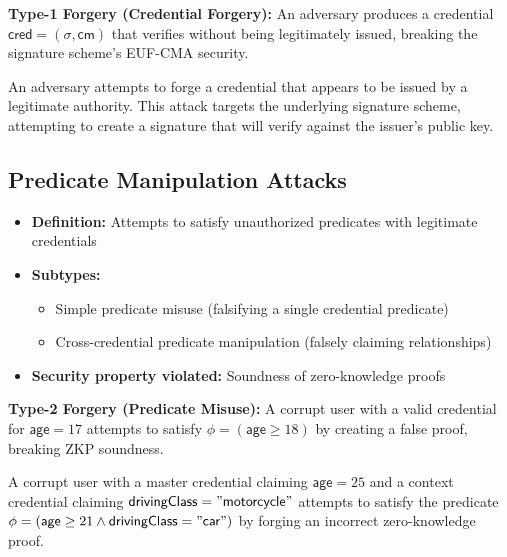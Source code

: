 \noindent\textbf{Type-1 Forgery (Credential Forgery):} An adversary produces a credential $\mathsf{cred} = (\sigma, \mathsf{cm})$ that verifies without being legitimately issued, breaking the signature scheme's EUF-CMA security.

\begin{example}
An adversary attempts to forge a credential that appears to be issued by a legitimate authority. This attack targets the underlying signature scheme, attempting to create a signature that will verify against the issuer's public key.
\end{example}

\subsection{Predicate Manipulation Attacks}
\begin{itemize}
    \item \textbf{Definition:} Attempts to satisfy unauthorized predicates with legitimate credentials
    \item \textbf{Subtypes:}
    \begin{itemize}
        \item Simple predicate misuse (falsifying a single credential predicate)
        \item Cross-credential predicate manipulation (falsely claiming relationships)
    \end{itemize}
    \item \textbf{Security property violated:} Soundness of zero-knowledge proofs
\end{itemize}

\noindent\textbf{Type-2 Forgery (Predicate Misuse):} A corrupt user with a valid credential for $\mathsf{age} = 17$ attempts to satisfy $\phi = (\mathsf{age} \geq 18)$ by creating a false proof, breaking ZKP soundness.

\begin{example}
A corrupt user with a master credential claiming $\mathsf{age} = 25$ and a context credential claiming $\mathsf{drivingClass} = \mathsf{"motorcycle"}$ attempts to satisfy the predicate $\phi = (\mathsf{age} \geq 21 \land \mathsf{drivingClass} = \mathsf{"car"})$ by forging an incorrect zero-knowledge proof.
\end{example}

